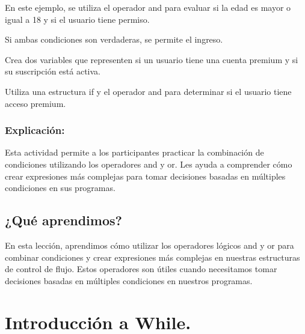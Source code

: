 \documentclass[
  a4paper,
  DIV=11,
  numbers=noendperiod,
  onepage,
  openany]{scrreprt}
\begin{document}
En este ejemplo, se utiliza el operador and para evaluar si la edad es
mayor o igual a 18 y si el usuario tiene permiso.

Si ambas condiciones son verdaderas, se permite el ingreso.

\begin{tcolorbox}[enhanced jigsaw, arc=.35mm, left=2mm, colback=white, opacityback=0, opacitybacktitle=0.6, toptitle=1mm, colframe=quarto-callout-tip-color-frame, colbacktitle=quarto-callout-tip-color!10!white, breakable, bottomrule=.15mm, rightrule=.15mm, bottomtitle=1mm, titlerule=0mm, toprule=.15mm, title=\textcolor{quarto-callout-tip-color}{\faLightbulb}\hspace{0.5em}{Actividad Práctica:}, coltitle=black, leftrule=.75mm]

Crea dos variables que representen si un usuario tiene una cuenta
premium y si su suscripción está activa.

Utiliza una estructura if y el operador and para determinar si el
usuario tiene acceso premium.

\end{tcolorbox}

\subsection{Explicación:}\label{explicaciuxf3n-23}

Esta actividad permite a los participantes practicar la combinación de
condiciones utilizando los operadores and y or. Les ayuda a comprender
cómo crear expresiones más complejas para tomar decisiones basadas en
múltiples condiciones en sus programas.

\section{¿Qué aprendimos?}\label{quuxe9-aprendimos-6}

En esta lección, aprendimos cómo utilizar los operadores lógicos and y
or para combinar condiciones y crear expresiones más complejas en
nuestras estructuras de control de flujo. Estos operadores son útiles
cuando necesitamos tomar decisiones basadas en múltiples condiciones en
nuestros programas.

\chapter{Introducción a While.}\label{introducciuxf3n-a-while.}
\end{document}
